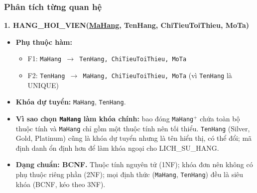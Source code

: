 \documentclass[11pt, a4paper]{article}
\newcommand{\pk}[1]{\bgroup\ULdepth=1.8pt\uline{#1}\egroup}
\begin{document}
\subsubsection{Phân tích từng quan hệ}

\textbf{1. HANG\_HOI\_VIEN(\pk{MaHang}, TenHang, ChiTieuToiThieu, MoTa)}
\begin{itemize}
    \item \textbf{Phụ thuộc hàm:}
    \begin{itemize}
        \item F1: \texttt{MaHang $\rightarrow$ TenHang, ChiTieuToiThieu, MoTa}
        \item F2: \texttt{TenHang $\rightarrow$ MaHang, ChiTieuToiThieu, MoTa} (vì \texttt{TenHang} là UNIQUE)
    \end{itemize}
    \item \textbf{Khóa dự tuyển:} \texttt{MaHang}, \texttt{TenHang}.
    \item \textbf{Vì sao chọn \texttt{MaHang} làm khóa chính:} bao đóng \texttt{MaHang$^+$} chứa toàn bộ thuộc tính và \texttt{MaHang} chỉ gồm một thuộc tính nên tối thiểu. \texttt{TenHang} (Silver, Gold, Platinum) cũng là khóa dự tuyển nhưng là tên hiển thị, có thể đổi; mã định danh ổn định hơn để làm khóa ngoại cho LICH\_SU\_HANG.
    \item \textbf{Dạng chuẩn: BCNF.} Thuộc tính nguyên tử (1NF); khóa đơn nên không có phụ thuộc riêng phần (2NF); mọi định thức (\texttt{MaHang}, \texttt{TenHang}) đều là siêu khóa (BCNF, kéo theo 3NF).
\end{itemize}
\end{document}
